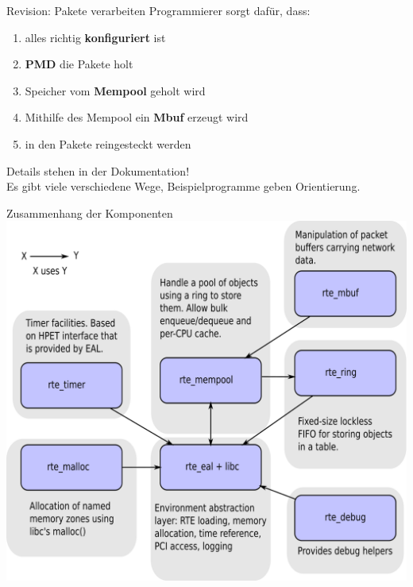 \documentclass{beamer}
\begin{document}
\begin{frame}{Revision: Pakete verarbeiten}
    Programmierer sorgt dafür, dass:
    \begin{enumerate}
        \item alles richtig \textbf{konfiguriert} ist
        \item \textbf{PMD} die Pakete holt
        \item Speicher vom \textbf{Mempool} geholt wird
        \item Mithilfe des Mempool ein \textbf{Mbuf} erzeugt wird
        \item in den Pakete reingesteckt werden
    \end{enumerate}
    \vspace{.5cm} Details stehen in der Dokumentation! \\
    Es gibt viele verschiedene Wege, Beispielprogramme geben Orientierung.
\end{frame}

\begin{frame}{Zusammenhang der Komponenten}
    \centering
    \includegraphics[width=.9\textheight]{img/architecture.png}
\end{frame}
\end{document}
